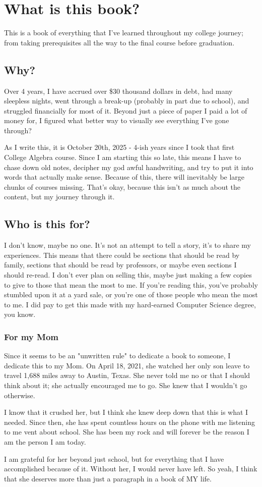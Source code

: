 \section{What is this book?}
This is a book of everything that I've learned throughout my college journey; from taking
prerequisites all the way to the final course before graduation.
\subsection{Why?}
Over 4 years, I have accrued over \$30 thousand dollars in debt, had many sleepless nights,
went through a break-up (probably in part due to school), and struggled financially for most of it.
Beyond just a piece of paper I paid a lot of money for, I figured what better way
to visually see everything I've gone through?

As I write this, it is October 20th, 2025 - 4-ish years since I took that first
College Algebra course. Since I am starting this so late, this means I have to
chase down old notes, decipher my god awful handwriting, and try to put it into
words that actually make sense. Because of this, there will inevitably be large
chunks of courses missing. That's okay, because this isn't as much about the content,
but my journey through it.


\subsection{Who is this for?}
I don't know, maybe no one. It's not an attempt to tell a story, it's to share my
experiences. This means that there could be sections that should be read by family,
sections that should be read by professors, or maybe even sections I should re-read.
I don't ever plan on selling this, maybe just making a few copies to give to those
that mean the most to me. If you're reading this, you've probably stumbled upon it
at a yard sale, or you're one of those people who mean the most to me. I did pay
to get this made with my hard-earned Computer Science degree, you know.

\subsubsection{For my Mom}
Since it seems to be an "unwritten rule" to dedicate a book to someone, I dedicate
this to my Mom. On April 18, 2021, she watched her only son leave to travel 1,688 miles
away to Austin, Texas. She never told me no or that I should think about it; she actually
encouraged me to go. She knew that I wouldn't go otherwise.

I know that it crushed her,
but I think she knew deep down that this is what I needed. Since then, she has spent countless
hours on the phone with me listening to me vent about school. She has been my rock and
will forever be the reason I am the person I am today.

I am grateful for her beyond just school, but for everything that I have accomplished
because of it. Without her, I would never have left. So yeah, I think that she deserves
more than just a paragraph in a book of MY life.
